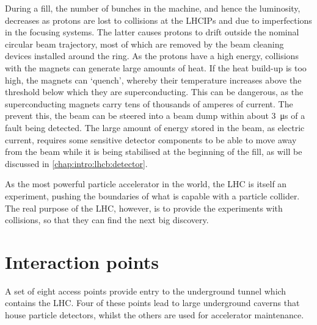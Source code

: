 During a fill, the number of bunches in the machine, and hence the luminosity, 
decreases as protons are lost to collisions at the \acp{LHCIP} and due to 
imperfections in the focusing systems.
The latter causes protons to drift outside the nominal circular beam 
trajectory, most of which are removed by the beam cleaning devices installed 
around the ring.
As the protons have a high energy, collisions with the magnets can generate 
large amounts of heat.
If the heat build-up is too high, the magnets can `quench', whereby their 
temperature increases above the threshold below which they are superconducting.
This can be dangerous, as the superconducting magnets carry tens of thousands 
of amperes of current.
The prevent this, the beam can be steered into a beam dump within about 
\SI{3}{\micro\second} of a fault being detected.
The large amount of energy stored in the beam, as electric current, requires 
some sensitive detector components to be able to move away from the beam while 
it is being stabilised at the beginning of the fill, as will be discussed in 
\cref{chap:intro:lhcb:detector}.

As the most powerful particle accelerator in the world, the \ac{LHC} is itself 
an experiment, pushing the boundaries of what is capable with a particle 
collider.
The real purpose of the \ac{LHC}, however, is to provide the experiments with 
collisions, so that they can find the next big discovery.

\section{Interaction points}
\label{chap:intro:lhc:ips}

A set of eight access points provide entry to the underground tunnel which 
contains the \ac{LHC}.
Four of these points lead to large underground caverns that house particle 
detectors, whilst the others are used for accelerator maintenance.

